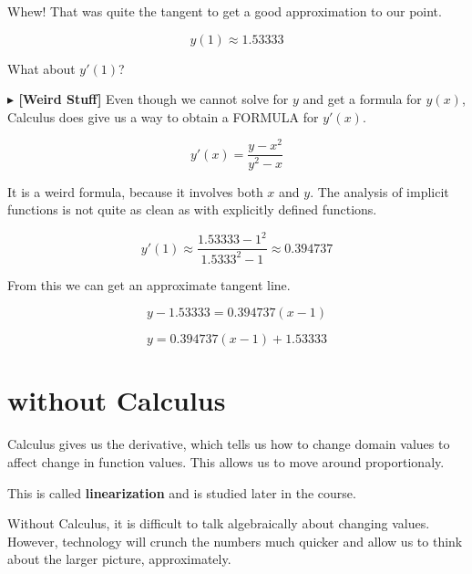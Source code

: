 \documentclass{ximera}
\begin{document}
Whew!  That was quite the tangent to get a good approximation to our point.

\[ y(1) \approx 1.53333   \]


What about $y'(1)$?



\textbf{\textcolor{red!80!black}{$\blacktriangleright$  [Weird Stuff]}}  Even though we cannot solve for $y$ and get a formula for $y(x)$, Calculus does give us a way to obtain a FORMULA for $y'(x)$.



\[
y'(x) = \frac{y - x^2}{y^2 - x}
\]


It is a weird formula, because it involves both $x$ and $y$.  The analysis of implicit functions is not quite as clean as with explicitly defined functions.


\[
y'(1) \approx \frac{1.53333 - 1^2}{1.5333^2 - 1} \approx 0.394737
\]



From this we can get an approximate tangent line.

\[
y - 1.53333 = 0.394737(x-1)
\]


\[
y = 0.394737(x-1) + 1.53333
\]






\begin{center}
\end{center}






\section{without Calculus}



Calculus gives us the derivative, which tells us how to change domain values to affect change in function values.  This allows us to move around proportionaly.  

This is called \textbf{linearization} and is studied later in the course.

Without Calculus, it is difficult to talk algebraically about changing values.  However, technology will crunch the numbers much quicker and allow us to think about the larger picture, approximately.
\end{document}
